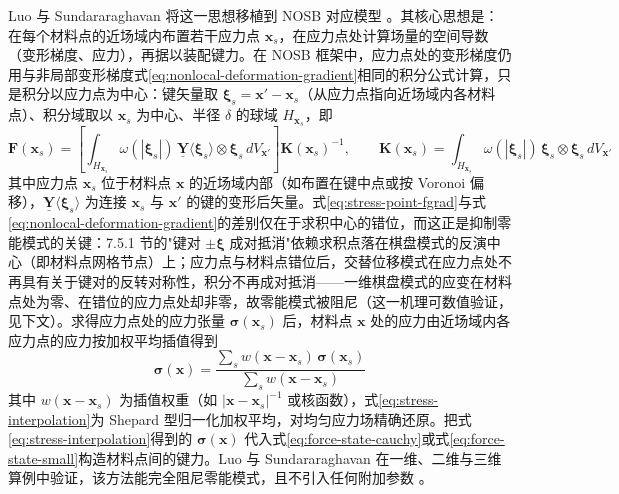 Luo 与 Sundararaghavan 将这一思想移植到 NOSB 对应模型 \cite{LuoSundararaghavan2018}。其核心思想是：在每个材料点的近场域内布置若干应力点 $\mathbf{x}_s$，在应力点处计算场量的空间导数（变形梯度、应力），再据以装配键力。在 NOSB 框架中，应力点处的变形梯度仍用与非局部变形梯度式\eqref{eq:nonlocal-deformation-gradient}相同的积分公式计算，只是积分以应力点为中心：键矢量取 $\boldsymbol{\xi}_s=\mathbf{x}'-\mathbf{x}_s$（从应力点指向近场域内各材料点）、积分域取以 $\mathbf{x}_s$ 为中心、半径 $\delta$ 的球域 $H_{\mathbf{x}_s}$，即
\begin{equation}
  \mathbf{F}(\mathbf{x}_s)
  =\left[\int_{H_{\mathbf{x}_s}}\omega(|\boldsymbol{\xi}_s|)\,
    \underline{\mathbf{Y}}\langle\boldsymbol{\xi}_s\rangle\otimes\boldsymbol{\xi}_s\,dV_{\mathbf{x}'}\right]\mathbf{K}(\mathbf{x}_s)^{-1},
  \qquad
  \mathbf{K}(\mathbf{x}_s)=\int_{H_{\mathbf{x}_s}}\omega(|\boldsymbol{\xi}_s|)\,
    \boldsymbol{\xi}_s\otimes\boldsymbol{\xi}_s\,dV_{\mathbf{x}'}
  \label{eq:stress-point-fgrad}
\end{equation}
其中应力点 $\mathbf{x}_s$ 位于材料点 $\mathbf{x}$ 的近场域内部（如布置在键中点或按 Voronoi 偏移），$\underline{\mathbf{Y}}\langle\boldsymbol{\xi}_s\rangle$ 为连接 $\mathbf{x}_s$ 与 $\mathbf{x}'$ 的键的变形后矢量。式\eqref{eq:stress-point-fgrad}与式\eqref{eq:nonlocal-deformation-gradient}的差别仅在于求积中心的错位，而这正是抑制零能模式的关键：7.5.1 节的"键对 $\pm\boldsymbol{\xi}$ 成对抵消"依赖求积点落在棋盘模式的反演中心（即材料点网格节点）上；应力点与材料点错位后，交替位移模式在应力点处不再具有关于键对的反转对称性，积分不再成对抵消——一维棋盘模式的应变在材料点处为零、在错位的应力点处却非零，故零能模式被阻尼（这一机理可数值验证，见下文）。求得应力点处的应力张量 $\boldsymbol{\sigma}(\mathbf{x}_s)$ 后，材料点 $\mathbf{x}$ 处的应力由近场域内各应力点的应力按加权平均插值得到
\begin{equation}
  \boldsymbol{\sigma}(\mathbf{x})
  =\frac{\sum_{s}w(\mathbf{x}-\mathbf{x}_s)\,\boldsymbol{\sigma}(\mathbf{x}_s)}
  {\sum_{s}w(\mathbf{x}-\mathbf{x}_s)}
  \label{eq:stress-interpolation}
\end{equation}
其中 $w(\mathbf{x}-\mathbf{x}_s)$ 为插值权重（如 $\lvert\mathbf{x}-\mathbf{x}_s\rvert^{-1}$ 或核函数），式\eqref{eq:stress-interpolation}为 Shepard 型归一化加权平均，对均匀应力场精确还原。把式\eqref{eq:stress-interpolation}得到的 $\boldsymbol{\sigma}(\mathbf{x})$ 代入式\eqref{eq:force-state-cauchy}或式\eqref{eq:force-state-small}构造材料点间的键力。Luo 与 Sundararaghavan 在一维、二维与三维算例中验证，该方法能完全阻尼零能模式，且不引入任何附加参数 \cite{LuoSundararaghavan2018}。

